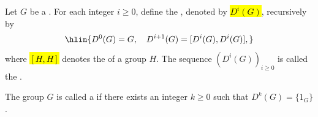 \begin{definition} \label{definition:solvable_group_via_derived_series}
Let $G$ be a . For each integer $i \geq 0$, define the , denoted by \hl{$D^i(G)$}, recursively by
$$\hlin{D^0(G) = G,\quad D^{i+1}(G) = [D^i(G), D^i(G)],}$$
where \hl{$[H,H]$} denotes the  of a group $H$. The sequence $(D^i(G))_{i \geq 0}$ is called the .

The group $G$ is called a  if there exists an integer $k \geq 0$ such that $D^k(G) = \{1_G\}$.
\end{definition}
